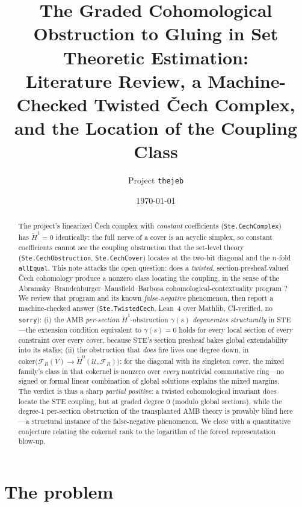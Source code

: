 \documentclass[11pt]{article}
\title{The Graded Cohomological Obstruction to Gluing in Set Theoretic
Estimation:\\ Literature Review, a Machine-Checked Twisted \v{C}ech
Complex,\\ and the Location of the Coupling Class}
\author{Project \texttt{thejeb}}
\date{\today}
\newcommand{\lean}[1]{\texttt{#1}}
\newcommand{\cech}{\v{C}ech}
\newcommand{\Hc}[1]{\check{H}^{#1}}
\newcommand{\FR}{\mathcal{F}_R}
\newcommand{\coker}{\mathrm{coker}}
\begin{document}
\maketitle

\begin{abstract}
The project's linearized \cech{} complex with \emph{constant}
coefficients (\lean{Ste.CechComplex}) has $\Hc{1}=0$ identically: the
full nerve of a cover is an acyclic simplex, so constant coefficients
cannot see the coupling obstruction that the set-level theory
(\lean{Ste.CechObstruction}, \lean{Ste.CechCover}) locates at the
two-bit diagonal and the $n$-fold \lean{allEqual}.  This note attacks
the open question: does a \emph{twisted}, section-presheaf-valued
\cech{} cohomology produce a nonzero class locating the coupling, in
the sense of the Abramsky--Brandenburger--Mansfield--Barbosa
cohomological-contextuality program
\citep{abramsky2011sheaf,abramsky2012cohomology}?  We review that
program and its known \emph{false-negative} phenomenon, then report a
machine-checked answer (\lean{Ste.TwistedCech}, Lean~4 over Mathlib,
CI-verified, no \lean{sorry}): (i) the AMB \emph{per-section}
$\Hc{1}$-obstruction $\gamma(s)$ \emph{degenerates structurally} in
STE---the extension condition equivalent to $\gamma(s)=0$
\citep[Prop.~4.2]{abramsky2012cohomology} holds for every local section
of every constraint over every cover, because STE's section presheaf
bakes global extendability into its stalks; (ii) the obstruction that
\emph{does} fire lives one degree down, in
$\coker\bigl(\FR(V)\to\Hc{0}(\mathcal{U},\FR)\bigr)$: for the diagonal
with its singleton cover, the mixed family's class in that cokernel is
nonzero over \emph{every} nontrivial commutative ring---no signed or
formal linear combination of global solutions explains the mixed
margins.  The verdict is thus a sharp \emph{partial positive}: a
twisted cohomological invariant does locate the STE coupling, but at
graded degree $0$ (modulo global sections), while the degree-$1$
per-section obstruction of the transplanted AMB theory is provably
blind here---a structural instance of the false-negative phenomenon.
We close with a quantitative conjecture relating the cokernel rank to
the logarithm of the forced representation blow-up.
\end{abstract}

\section{The problem}
\label{sec:problem}
\end{document}
